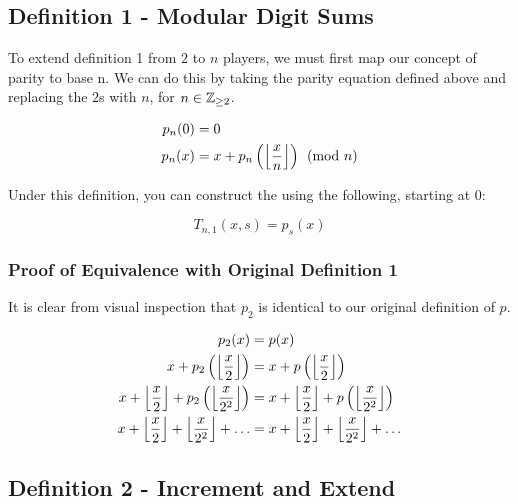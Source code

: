 \documentclass[conference]{IEEEtran}
\begin{document}
\subsection{Definition 1 - Modular Digit Sums}


To extend definition 1 from $2$ to $n$ players, we must first map our concept of parity to base n. We can do this by taking the parity equation defined above and replacing the $2$s with $n$, for $n \in \mathbb{Z}_{\ge 2}$.

\begin{equation}
    \begin{aligned}
p_n(0) &= 0 \\
p_n(x) &= x + p_n\left(\left\lfloor \dfrac{x}{n} \right\rfloor\right) \pmod{n}
    \end{aligned}
\end{equation}

Under this definition, you can construct the \TMS using the following, starting at 0:

\begin{equation}
    T_{n,1}(x, s) = p_s(x)
\end{equation}

\subsubsection{Proof of Equivalence with Original Definition 1}

It is clear from visual inspection that $p_2$ is identical to our original definition of $p$.

\begin{equation}
    \begin{aligned}
                                                           p_2(x) &= p(x) \\
                         x + p_2\left(\left\lfloor \dfrac{x}{2} \right\rfloor\right) &= x + p\left(\left\lfloor \dfrac{x}{2} \right\rfloor\right) \\
x + \left\lfloor \dfrac{x}{2} \right\rfloor + p_2\left(\left\lfloor \dfrac{x}{2^2} \right\rfloor\right) &= x + \left\lfloor \dfrac{x}{2} \right\rfloor + p\left(\left\lfloor \dfrac{x}{2^2} \right\rfloor\right) \\
       x + \left\lfloor \dfrac{x}{2} \right\rfloor + \left\lfloor \dfrac{x}{2^2} \right\rfloor + \ldots &= x + \left\lfloor \dfrac{x}{2} \right\rfloor + \left\lfloor \dfrac{x}{2^2} \right\rfloor + \ldots
    \end{aligned}
\end{equation}

\subsection{Definition 2 - Increment and Extend}
\end{document}
